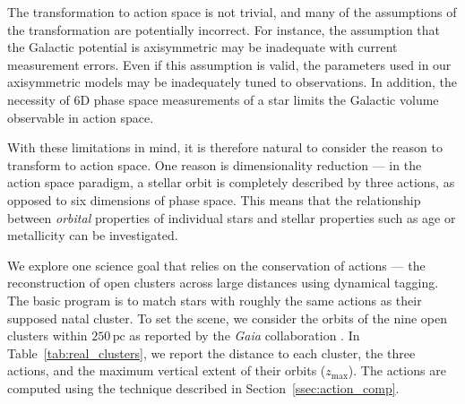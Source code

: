 \documentclass[twocolumn]{aastex62}
\newcommand{\pc}{\text{pc}}
\begin{document}
The transformation to action space is not trivial, and many of the assumptions
of the transformation are potentially incorrect. For instance, the assumption
that the Galactic potential is axisymmetric may be inadequate with current
measurement errors. Even if this assumption is valid, the parameters used in
our axisymmetric models may be inadequately tuned to observations. In
addition, the necessity of 6D phase space measurements of a star limits the
Galactic volume observable in action space.

With these limitations in mind, it is therefore natural to consider the reason
to transform to action space. One reason is dimensionality reduction --- in
the action space paradigm, a stellar orbit is completely described by three
actions, as opposed to six dimensions of phase space. This means that the
relationship between {\em orbital} properties of individual stars and stellar
properties such as age or metallicity can be investigated.

We explore one science goal that relies on the conservation of actions --- the
reconstruction of open clusters across large distances using dynamical
tagging. The basic program is to match stars with roughly the same actions as
their supposed natal cluster. To set the scene, we consider the orbits of the
nine open clusters within $250\,\pc$ as reported by the {\em Gaia}
collaboration \citep{2018AA...616A..10G}. In Table~\ref{tab:real_clusters},
we report the distance to each cluster, the three actions, and the maximum
vertical extent of their orbits ($z_{\text{max}}$). The actions are computed
using the technique described in Section~\ref{ssec:action_comp}.
\end{document}
